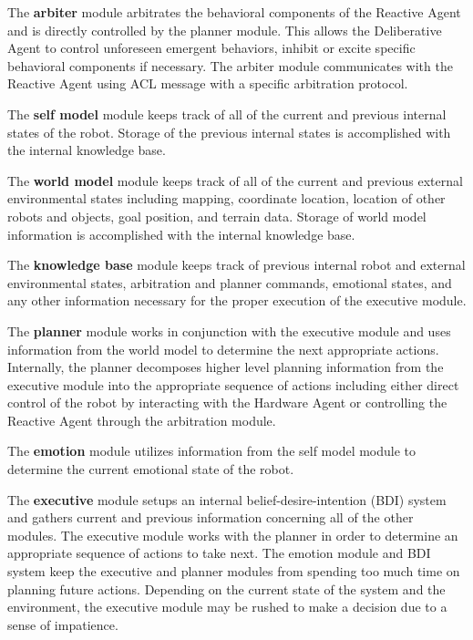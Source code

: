       The \textbf{arbiter} module arbitrates the behavioral components of the
        Reactive Agent and is directly controlled by the planner module.
      This allows the Deliberative Agent to control unforeseen emergent 
        behaviors, inhibit or excite specific behavioral components if necessary.
      The arbiter module communicates with the Reactive Agent using ACL message 
        with a specific arbitration protocol.

      The \textbf{self model} module keeps track of all of the current and 
        previous internal states of the robot.
      Storage of the previous internal states is accomplished with the 
        internal knowledge base.
        
      The \textbf{world model} module keeps track of all of the current and 
        previous external environmental states including mapping, coordinate
        location, location of other robots and objects, goal position, 
        and terrain data.
      Storage of world model information is accomplished with the internal 
        knowledge base.

      The \textbf{knowledge base} module keeps track of previous internal 
        robot and external environmental states, arbitration and planner 
        commands, emotional states, and any other information necessary
        for the proper execution of the executive module.

      The \textbf{planner} module works in conjunction with the executive 
        module and uses information from the world model to determine the 
        next appropriate actions.
      Internally, the planner decomposes higher level planning information from
        the executive module into the appropriate sequence of actions including 
        either direct control of the robot by interacting with the Hardware Agent 
        or controlling the Reactive Agent through the arbitration module.

      The \textbf{emotion} module utilizes information from the self model
        module to determine the current emotional state of the robot.

      The \textbf{executive} module setups an internal belief-desire-intention 
        (BDI) system and gathers current and previous information concerning
        all of the other modules.
      The executive module works with the planner in order to determine an
        appropriate sequence of actions to take next.
      The emotion module and BDI system keep the executive and planner modules
        from spending too much time on planning future actions.
      Depending on the current state of the system and the environment, the
        executive module may be rushed to make a decision due to a sense of
        impatience.

